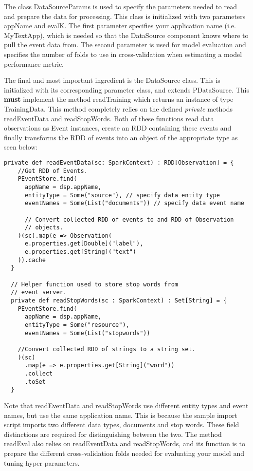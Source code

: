 \documentclass[a4paper,12pt]{article}
\renewcommand{\bf}[1]{\textbf{#1}}
\renewcommand{\it}[1]{\textit{#1}}
\newcommand{\3}{\left}
\newcommand{\4}{\right}
\renewcommand{\-}[1]{{}^{-#1}}
\begin{document}
The class DataSourceParams is used to specify the parameters needed to read and prepare the data for processing. This class is initialized with two parameters appName and evalK. The first parameter specifies your application name (i.e. MyTextApp), which is needed so that the DataSource component knows where to pull the event data from. The second parameter is used for model evaluation and specifies the number of folds to use in cross-validation 
when estimating a model performance metric.

\break

The final and most important ingredient is the DataSource class. This is initialized with its corresponding parameter class, and extends PDataSource. This \bf{must} implement the method readTraining which returns an instance of type TrainingData. This method completely relies on the defined \it{private} methods readEventData and readStopWords. Both of these functions read data observations as Event instances, create an RDD containing these events and finally transforms the RDD of events into an object of the appropriate type as seen below:

\begin{verbatim}
private def readEventData(sc: SparkContext) : RDD[Observation] = {
    //Get RDD of Events.
    PEventStore.find(
      appName = dsp.appName,
      entityType = Some("source"), // specify data entity type
      eventNames = Some(List("documents")) // specify data event name

      // Convert collected RDD of events to and RDD of Observation
      // objects.
    )(sc).map(e => Observation(
      e.properties.get[Double]("label"),
      e.properties.get[String]("text")
    )).cache
  }

  // Helper function used to store stop words from
  // event server.
  private def readStopWords(sc : SparkContext) : Set[String] = {
    PEventStore.find(
      appName = dsp.appName,
      entityType = Some("resource"),
      eventNames = Some(List("stopwords"))

    //Convert collected RDD of strings to a string set.
    )(sc)
      .map(e => e.properties.get[String]("word"))
      .collect
      .toSet
  }
\end{verbatim}

Note that readEventData and readStopWords use different entity types and event names, but use the same application name. This is because the sample import script imports two different data types, documents and stop words. These field distinctions are required for distinguishing between the two. The method readEval also relies on readEventData and readStopWords, and its function is to prepare the different cross-validation folds needed for evaluating your model and tuning hyper parameters. 
\end{document}
